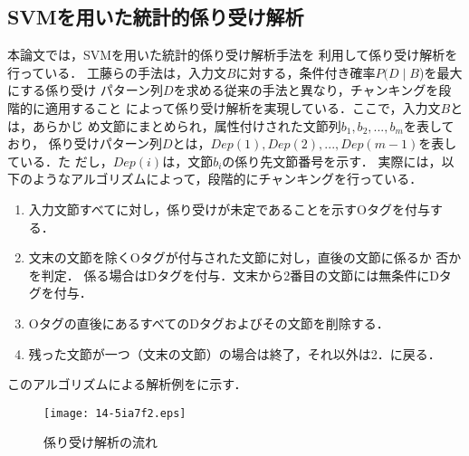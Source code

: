 \documentclass[japanese]{jnlp_1.3e}
\begin{document}
\subsection{SVMを用いた統計的係り受け解析}
\label{subsec:CaboCha}
本論文では，SVMを用いた統計的係り受け解析手法\cite{TKudo02aj}を
利用して係り受け解析を行っている．
工藤らの手法は，入力文$B$に対する，条件付き確率$P(D\!\mid\!B$)を最大にする係り受け
パターン列$D$を求める従来の手法と異なり，チャンキングを段階的に適用すること
によって係り受け解析を実現している．ここで，入力文$B$とは，あらかじ
め文節にまとめられ，属性付けされた文節列${b_1,b_2,...,b_m}$を表しており，
係り受けパターン列$D$とは，${Dep(1),Dep(2),...,Dep(m-1)}$を表している．た
だし，$Dep(i)$は，文節$b_i$の係り先文節番号を示す．
実際には，以下のようなアルゴリズムによって，段階的にチャンキングを行っている．
\begin{enumerate}
 \item 入力文節すべてに対し，係り受けが未定であることを示すOタグを付与する．
 \item 文末の文節を除くOタグが付与された文節に対し，直後の文節に係るか
       否かを判定．
       係る場合はDタグを付与．文末から2番目の文節には無条件にDタグを付与．
 \item Oタグの直後にあるすべてのDタグおよびその文節を削除する．
 \item 残った文節が一つ（文末の文節）の場合は終了，それ以外は2．に戻る．
\end{enumerate}
このアルゴリズムによる解析例をに示す．


\begin{figure}[b]
\begin{center}
\texttt{[image: 14-5ia7f2.eps]}
\end{center}
 \caption{係り受け解析の流れ}
 \label{fig:example_dep}
\end{figure}
\end{document}

